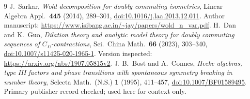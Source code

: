 \documentclass[11pt]{article}
\theoremstyle{remark}
\begin{document}
\begin{thebibliography}{9}
J.~Sarkar, \emph{Wold decomposition for doubly commuting isometries},
Linear Algebra Appl.\ \textbf{445} (2014), 289--301,
\href{https://doi.org/10.1016/j.laa.2013.12.011}{doi:10.1016/j.laa.2013.12.011}.
Author manuscript:
\url{https://www.isibang.ac.in/~jay/papers/wold_n_var.pdf}.
H.~Dan and K.~Guo,
\emph{Dilation theory and analytic model theory for doubly commuting
sequences of $C_{\cdot0}$-contractions},
Sci.\ China Math.\ \textbf{66} (2023), 303--340,
\href{https://doi.org/10.1007/s11425-020-1965-1}{doi:10.1007/s11425-020-1965-1}.
Version inspected: \url{https://arxiv.org/abs/1907.05815v2}.
J.-B.~Bost and A.~Connes,
\emph{Hecke algebras, type III factors and phase transitions with
spontaneous symmetry breaking in number theory},
Selecta Math.\ (N.S.) \textbf{1} (1995), 411--457,
\href{https://doi.org/10.1007/BF01589495}{doi:10.1007/BF01589495}.
Primary publisher record checked; used here for context only.
\end{thebibliography}
\end{document}
